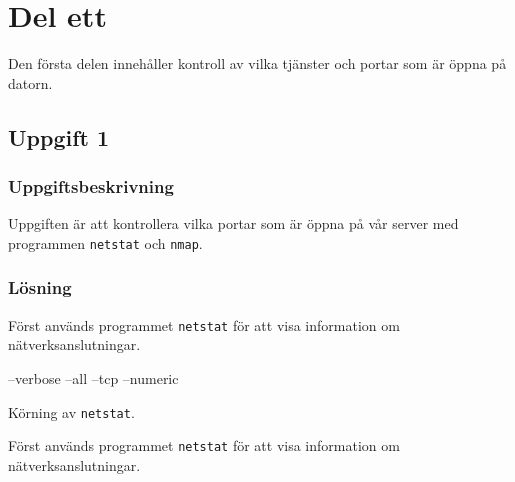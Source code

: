%
%
%


\section{Del ett}
Den första delen innehåller kontroll av vilka tjänster och portar som är öppna
på datorn.


\subsection{Uppgift 1}
\subsubsection{Uppgiftsbeskrivning}
Uppgiften är att kontrollera vilka portar som är öppna på vår server med
programmen \texttt{netstat} och \texttt{nmap}.  


\subsubsection{Lösning}
Först används programmet \texttt{netstat} för att visa information om
nätverksanslutningar. 

--verbose 
--all 
--tcp 
--numeric

\begin{listing}[H]
  \caption{Körning av \texttt{netstat}.}
  \label{listing:netstat}
\end{listing}


Först används programmet \texttt{netstat} för att visa information om
nätverksanslutningar. 
